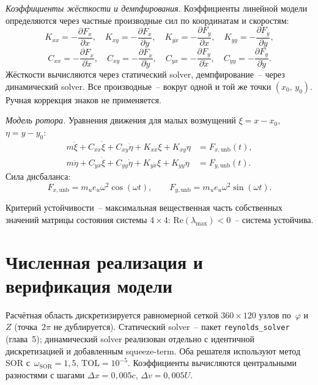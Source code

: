 \textit{Коэффициенты жёсткости и демпфирования.}
Коэффициенты линейной модели определяются через частные
производные сил по координатам и скоростям:
\begin{equation}
  K_{xx} = -\frac{\partial F_x}{\partial x},\quad
  K_{xy} = -\frac{\partial F_x}{\partial y},\quad
  K_{yx} = -\frac{\partial F_y}{\partial x},\quad
  K_{yy} = -\frac{\partial F_y}{\partial y},
  \label{eq:dyn_K}
\end{equation}
\begin{equation}
  C_{xx} = -\frac{\partial F_x}{\partial\dot{x}},\quad
  C_{xy} = -\frac{\partial F_x}{\partial\dot{y}},\quad
  C_{yx} = -\frac{\partial F_y}{\partial\dot{x}},\quad
  C_{yy} = -\frac{\partial F_y}{\partial\dot{y}}.
  \label{eq:dyn_C}
\end{equation}
Жёсткости вычисляются через статический solver,
демпфирование~-- через динамический solver. Все производные~--
вокруг одной и той же точки $(x_0,\, y_0)$. Ручная коррекция
знаков не применяется.

\textit{Модель ротора.}
Уравнения движения для малых возмущений
$\xi = x - x_0$, $\eta = y - y_0$:
\begin{align}
  m\ddot{\xi} + C_{xx}\dot{\xi} + C_{xy}\dot{\eta}
    + K_{xx}\xi + K_{xy}\eta &= F_{x,\mathrm{unb}}(t),
  \label{eq:dyn_ode_x} \\
  m\ddot{\eta} + C_{yx}\dot{\xi} + C_{yy}\dot{\eta}
    + K_{yx}\xi + K_{yy}\eta &= F_{y,\mathrm{unb}}(t).
  \label{eq:dyn_ode_y}
\end{align}
Сила дисбаланса:
\begin{equation}
  F_{x,\mathrm{unb}} = m_u e_u \omega^2 \cos(\omega t),\qquad
  F_{y,\mathrm{unb}} = m_u e_u \omega^2 \sin(\omega t).
  \label{eq:dyn_unbalance}
\end{equation}

Критерий устойчивости~-- максимальная вещественная часть
собственных значений матрицы состояния системы $4 \times 4$:
$\mathrm{Re}(\lambda_{\max}) < 0$~-- система устойчива.


\section{Численная реализация и верификация модели}

Расчётная область дискретизируется равномерной сеткой
$360 \times 120$ узлов по~$\varphi$ и~$Z$ (точка~$2\pi$
не дублируется). Статический solver~-- пакет
\texttt{reynolds\_solver} (глава~5); динамический solver
реализован отдельно с идентичной дискретизацией и добавленным
squeeze-term. Оба решателя используют метод SOR
с~$\omega_{\mathrm{SOR}} = 1{,}5$,
$\mathrm{TOL} = 10^{-5}$. Коэффициенты вычисляются
центральными разностями с шагами $\Delta x = 0{,}005c$,
$\Delta v = 0{,}005U$.

